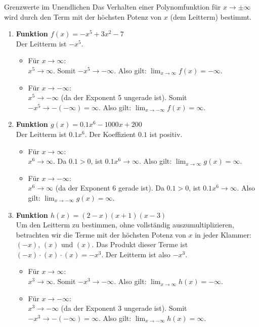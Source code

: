 \begin{loesungsumgebung}{Grenzwerte im Unendlichen}
Das Verhalten einer Polynomfunktion für $x \to \pm\infty$ wird durch den Term mit der höchsten Potenz von $x$ (dem Leitterm) bestimmt.

\begin{enumerate}[label=(\alph*)]
    \item \textbf{Funktion $f(x) = -x^5 + 3x^2 - 7$} \\
    Der Leitterm ist $-x^5$.
    \begin{itemize}
        \item Für $x \to \infty$: \\
        $x^5 \to \infty$. Somit $-x^5 \to -\infty$.
        Also gilt: $\lim_{x \to \infty} f(x) = -\infty$.
        \item Für $x \to -\infty$: \\
        $x^5 \to -\infty$ (da der Exponent 5 ungerade ist). Somit $-x^5 \to -(-\infty) = \infty$.
        Also gilt: $\lim_{x \to -\infty} f(x) = \infty$.
    \end{itemize}

    \item \textbf{Funktion $g(x) = 0.1x^6 - 1000x + 200$} \\
    Der Leitterm ist $0.1x^6$. Der Koeffizient $0.1$ ist positiv.
    \begin{itemize}
        \item Für $x \to \infty$: \\
        $x^6 \to \infty$. Da $0.1 > 0$, ist $0.1x^6 \to \infty$.
        Also gilt: $\lim_{x \to \infty} g(x) = \infty$.
        \item Für $x \to -\infty$: \\
        $x^6 \to \infty$ (da der Exponent 6 gerade ist). Da $0.1 > 0$, ist $0.1x^6 \to \infty$.
        Also gilt: $\lim_{x \to -\infty} g(x) = \infty$.
    \end{itemize}

    \item \textbf{Funktion $h(x) = (2-x)(x+1)(x-3)$} \\
    Um den Leitterm zu bestimmen, ohne vollständig auszumultiplizieren, betrachten wir die Terme mit der höchsten Potenz von $x$ in jeder Klammer: $(-x)$, $(x)$ und $(x)$.
    Das Produkt dieser Terme ist $(-x) \cdot (x) \cdot (x) = -x^3$.
    Der Leitterm ist also $-x^3$.
    \begin{itemize}
        \item Für $x \to \infty$: \\
        $x^3 \to \infty$. Somit $-x^3 \to -\infty$.
        Also gilt: $\lim_{x \to \infty} h(x) = -\infty$.
        \item Für $x \to -\infty$: \\
        $x^3 \to -\infty$ (da der Exponent 3 ungerade ist). Somit $-x^3 \to -(-\infty) = \infty$.
        Also gilt: $\lim_{x \to -\infty} h(x) = \infty$.
    \end{itemize}
\end{enumerate}


\end{loesungsumgebung}

